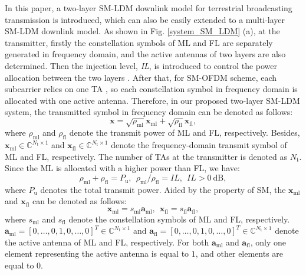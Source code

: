 \documentclass[journal]{IEEEtran}
\begin{document}
In this paper, a two-layer SM-LDM downlink model for terrestrial broadcasting transmission is introduced, which can also be easily extended to a multi-layer SM-LDM downlink model. As shown in Fig. \ref{system_SM_LDM} (a), at the transmitter, firstly the constellation symbols of ML and FL are separately generated in frequency domain, and the active antennas of two layers are also determined. Then the injection level, \textit{IL}, is introduced to control the power allocation between the two layers \cite{LDM_MIMO_C}. After that, for SM-OFDM scheme, each subcarrier relies on one TA \cite{SM_TBC}, so each constellation symbol in frequency domain is allocated with one active antenna. Therefore, in our proposed two-layer SM-LDM system, the transmitted symbol in frequency domain can be denoted as follows:
\begin{equation}
\mathbf{x} = \sqrt{\rho_\text{ml}}\mathbf{x}_\text{ml} + \sqrt{\rho_\text{fl}}\mathbf{x}_\text{fl},
\label{T_symbol}
\end{equation}
where $\rho_\text{ml}$ and $\rho_\text{fl}$ denote the transmit power of ML and FL, respectively. Besides, $\mathbf{x}_\text{ml} \in \mathbb{C}^{N_\text{t} \times 1}$ and $\mathbf{x}_\text{fl} \in \mathbb{C}^{N_\text{t} \times 1}$ denote the frequency-domain transmit symbol of ML and FL, respectively. The number of TAs at the transmitter is denoted as $N_\text{t}$. Since the ML is allocated with a higher power than FL, we have:
\begin{equation}
\rho_\text{ml}+\rho_\text{fl} = P_\text{u},\ \  \rho_\text{ml}/\rho_\text{fl} = \textit{IL}, \ \ \textit{IL} > 0\ \text{dB},
\end{equation}
where $P_\text{u}$ denotes the total transmit power. Aided by the property of SM, the $\mathbf{x}_\text{ml}$ and $\mathbf{x}_\text{fl}$ can be denoted as follows:
\begin{equation}
\mathbf{x}_\text{ml} = s_\text{ml}\mathbf{a}_\text{ml}, \ \ \mathbf{x}_\text{fl} = s_\text{fl}\mathbf{a}_\text{fl},
\end{equation}
where $s_\text{ml}$ and $s_\text{fl}$ denote the constellation symbols of ML and FL, respectively. $\mathbf{a}_\text{ml} = [0,\ldots,0,1,0,\ldots,0]^{T} \in \mathbb{C}^{N_\text{t} \times 1}$ and $\mathbf{a}_\text{fl} = [0,\ldots,0,1,0,\ldots,0]^{T} \in \mathbb{C}^{N_\text{t} \times 1}$ denote the active antenna of ML and FL, respectively. For both $\mathbf{a}_\text{ml}$ and $\mathbf{a}_\text{fl}$, only one element representing the active antenna is equal to $1$, and other elements are equal to $0$.
\end{document}

